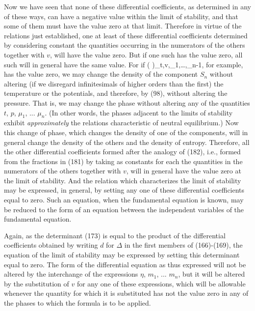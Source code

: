 \documentclass[12pt]{article}
\begin{document}
Now we have seen that none of these differential coefficients, as determined in any of these ways, can have a negative value within the limit of stability, and that some of them must have the value zero at that limit. Therefore in virtue of the relations just established, one at least of these differential coefficients determined by considering
constant the quantities occurring in the numerators of the others together with $v$, will have the value zero. But if one such has the value zero, all such will in general have the same value. For if
\eqs \left( \right)_{t,v,\mu_1,\dots,\mu_{n-1}}, \label{182}\eqe
for example, has the value zero, we may change the density of the component $S_n$ without altering (if we disregard infinitesimals of higher orders than the first) the temperature or the potentials, and therefore, by (98), without altering the pressure. That is, we may change the phase without altering any of the quantities $t$, $p$, $\mu_1$, ... $\mu_n$. (In other words, the phases adjacent to the limits of stability exhibit \textit{approximately} the relations characteristic of neutral equilibrium.) Now this change of phase, which changes the density of one of the components, will in general change the density of the others and the density of entropy.  Therefore, all the other differential coefficients formed after the analogy of (182), i.e., formed from the fractions in (181) by taking as constants for each the quantities in the numerators of the others together with $v$, will in general have the value zero at the limit of stability.  And the relation which characterizes the limit of stability may be expressed, in general, by setting any one of these differential coefficients equal to zero. Such an equation, when the fundamental equation is known, may be reduced to the form of an equation between the independent variables of the fundamental equation.


Again, as the determinant (173) is equal to the product of the differential coefficients obtained by writing $d$ for $\Delta$ in the first members of (166)-(169), the equation of the limit of stability may be expressed by setting this determinant equal to zero. The form of the differential equation as thus expressed will not be altered by the interchange of the expressions $\eta$, $m_1$, ... $m_n$, but it will be altered by the substitution of $v$ for any one of these expressions, which will be allowable whenever the quantity for which it is substituted has not the value zero in any of the phases to which the formula is to be applied.
\end{document}
